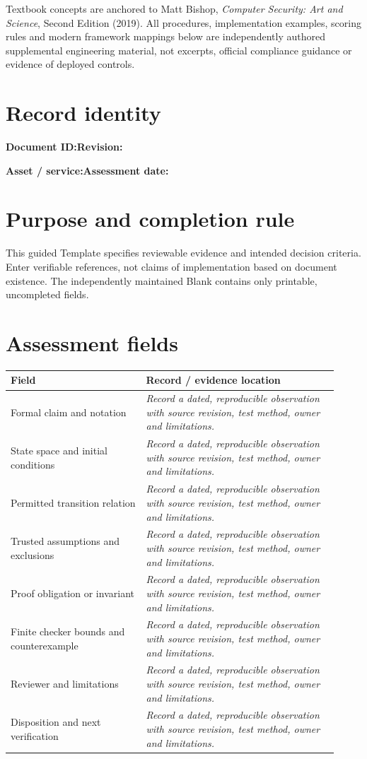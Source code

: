 \documentclass[10pt,letterpaper]{article}
\begin{document}
\makedoctocpage
\begin{notebox}
Textbook concepts are anchored to Matt Bishop, \emph{Computer Security: Art and Science}, Second Edition (2019). All procedures, implementation examples, scoring rules and modern framework mappings below are independently authored supplemental engineering material, not excerpts, official compliance guidance or evidence of deployed controls.
\end{notebox}
\section{Record identity}
\textbf{Document ID:}\enspace\hrulefill\quad\textbf{Revision:}\enspace\hrulefill
\par\medskip\textbf{Asset / service:}\enspace\hrulefill\quad\textbf{Assessment date:}\enspace\hrulefill
\section{Purpose and completion rule}
This guided Template specifies reviewable evidence and intended decision criteria. Enter verifiable references, not claims of implementation based on document existence. The independently maintained Blank contains only printable, uncompleted fields.
\section{Assessment fields}
\renewcommand{\arraystretch}{1.8}
\begin{longtable}{@{}p{0.38\linewidth}p{0.54\linewidth}@{}}
\toprule\textbf{Field}&\textbf{Record / evidence location}\\\midrule\endhead
Formal claim and notation & \emph{Record a dated, reproducible observation with source revision, test method, owner and limitations.}\\\midrule
State space and initial conditions & \emph{Record a dated, reproducible observation with source revision, test method, owner and limitations.}\\\midrule
Permitted transition relation & \emph{Record a dated, reproducible observation with source revision, test method, owner and limitations.}\\\midrule
Trusted assumptions and exclusions & \emph{Record a dated, reproducible observation with source revision, test method, owner and limitations.}\\\midrule
Proof obligation or invariant & \emph{Record a dated, reproducible observation with source revision, test method, owner and limitations.}\\\midrule
Finite checker bounds and counterexample & \emph{Record a dated, reproducible observation with source revision, test method, owner and limitations.}\\\midrule
Reviewer and limitations & \emph{Record a dated, reproducible observation with source revision, test method, owner and limitations.}\\\midrule
Disposition and next verification & \emph{Record a dated, reproducible observation with source revision, test method, owner and limitations.}\\\midrule
\bottomrule\end{longtable}
\end{document}
